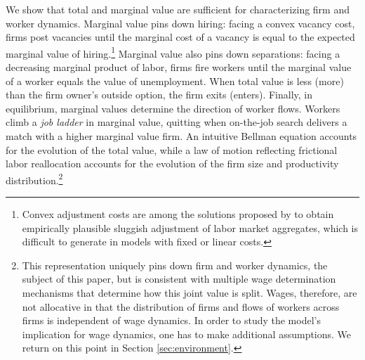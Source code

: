 We show that total and marginal value are sufficient for characterizing firm and worker dynamics.
Marginal value pins down hiring: facing a convex vacancy cost, firms post vacancies until the marginal cost of a vacancy is equal to the expected marginal value of hiring.\footnote{
    Convex adjustment costs are among the solutions proposed by \citet{ElsbyMichaelsRatner} to obtain empirically plausible sluggish adjustment of labor market aggregates, which is difficult to generate in models with fixed or linear costs.
}
Marginal value also pins down separations: facing a decreasing marginal product of labor, firms fire workers until the marginal value of a worker equals the value of unemployment.
When total value is less (more) than the firm owner's outside option, the firm exits (enters).
Finally, in equilibrium, marginal values determine the direction of worker flows.
Workers climb a \emph{job ladder} in marginal value, quitting when on-the-job search delivers a match with a higher marginal value firm.
An intuitive Bellman equation accounts for the evolution of the total value, while a law of motion reflecting frictional labor reallocation accounts for the evolution of the firm size and productivity distribution.\footnote{
    This representation uniquely pins down firm and worker dynamics, the subject of this paper, but is consistent with multiple wage determination mechanisms that determine how this joint value is split.
    Wages, therefore, are not allocative in that the distribution of firms and flows of workers across firms is independent of wage dynamics.
    In order to study the model's implication for wage dynamics, one has to make additional assumptions. We return on this point in Section \ref{sec:environment}.}

